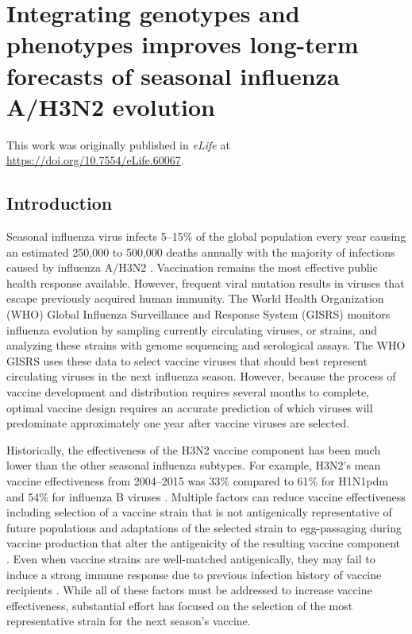 \chapter{Integrating genotypes and phenotypes improves long-term forecasts of seasonal influenza A/H3N2 evolution}

This work was originally published in \emph{eLife} at \url{https://doi.org/10.7554/eLife.60067}.

\section{Introduction}

Seasonal influenza virus infects 5--15\% of the global population every year causing an estimated 250,000 to 500,000 deaths annually with the majority of infections caused by influenza A/H3N2 \citep{flufactsheet}.
Vaccination remains the most effective public health response available.
However, frequent viral mutation results in viruses that escape previously acquired human immunity.
The World Health Organization (WHO) Global Influenza Surveillance and Response System (GISRS) monitors influenza evolution by sampling currently circulating viruses, or strains, and analyzing these strains with genome sequencing and serological assays.
The WHO GISRS uses these data to select vaccine viruses that should best represent circulating viruses in the next influenza season.
However, because the process of vaccine development and distribution requires several months to complete, optimal vaccine design requires an accurate prediction of which viruses will predominate approximately one year after vaccine viruses are selected.

Historically, the effectiveness of the H3N2 vaccine component has been much lower than the other seasonal influenza subtypes.
For example, H3N2's mean vaccine effectiveness from 2004--2015 was 33\% compared to 61\% for H1N1pdm and 54\% for influenza B viruses \citep{Belongia2016}.
Multiple factors can reduce vaccine effectiveness including selection of a vaccine strain that is not antigenically representative of future populations \citep{Belongia2016,gouma_antigenic_2020} and adaptations of the selected strain to egg-passaging during vaccine production that alter the antigenicity of the resulting vaccine component \citep{Zost2017}.
Even when vaccine strains are well-matched antigenically, they may fail to induce a strong immune response due to previous infection history of vaccine recipients \citep{Cobey2018}.
While all of these factors must be addressed to increase vaccine effectiveness, substantial effort has focused on the selection of the most representative strain for the next season's vaccine.


